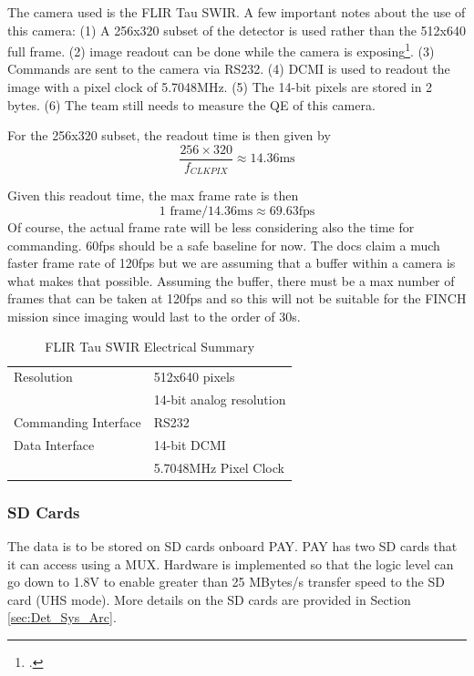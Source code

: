 \documentclass[12pt,a4paper]{article}
\begin{document}
    The camera used is the FLIR Tau SWIR. A few important notes about the use of 
    this camera: (1) A 256x320 subset of the detector is used rather than
    the 512x640 full frame. (2) image readout can be done while the camera is exposing\footcite{TAU_ProdSpec}. 
    (3) Commands are sent to the camera via RS232. (4) DCMI is used to readout 
    the image with a pixel clock of 5.7048MHz. (5) The 14-bit pixels are 
    stored in 2 bytes. (6) The team still needs to measure the QE of this camera. 

    For the 256x320 subset, the readout time is then given by 
    \begin{equation}
        \frac{256 \times 320}{f_{CLKPIX}} \approx 14.36\text{ms}
    \end{equation}

    Given this readout time, the max frame rate is then 
    \begin{equation}
        1 \text{ frame} / 14.36\text{ms} \approx 69.63 \text{fps}
    \end{equation}
    Of course, the actual frame rate will be less considering also the 
    time for commanding. 60fps should be a safe baseline for now. The docs claim a much faster frame rate of 120fps but we are assuming that 
    a buffer within a camera is what makes that possible. Assuming the buffer, 
    there must be a max number of frames that can be taken at 120fps and so this 
    will not be suitable for the FINCH mission since imaging would last to the 
    order of 30s. 

    \begin{table}[H]\centering
        \begin{tabular}{l | l}
            Resolution & 512x640 pixels \\
            & 14-bit analog resolution \\ \hline
            Commanding Interface & RS232 \\ \hline
            Data Interface & 14-bit DCMI\\
            & 5.7048MHz Pixel Clock\\
        \end{tabular}
        \caption{FLIR Tau SWIR Electrical Summary}
    \end{table}

    \subsubsection{SD Cards}
    The data is to be stored on SD cards onboard PAY. PAY has two SD cards that 
    it can access using a MUX. Hardware is implemented so that the logic level 
    can go down to 1.8V to enable greater than 25 MBytes/s transfer speed to the 
    SD card (UHS mode). More details on the SD cards are provided in 
    Section \ref{sec:Det_Sys_Arc}. 
\end{document}
